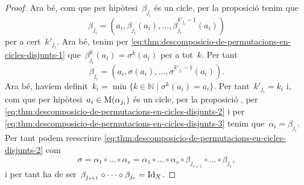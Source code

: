 \documentclass[../fonaments-de-les-matematiques.tex]{subfiles}
\begin{document}
\begin{proof}
        Ara bé, com que per hipòtesi~\(\beta_{j_{i}}\) és un cicle, per la proposició  tenim que
        \[
            \beta_{j_{i}}=\left(a_{i},\beta_{j_{i}}(a_{i}),\dots,\beta^{k'_{j_{i}}-1}_{j_{i}}(a_{i})\right)
        \]
        per a cert~\(k'_{j_{i}}\).
        Ara bé, tenim per \eqref{eq:thm:descomposicio-de-permutacions-en-cicles-disjunts-1} que~\(\beta^{k}_{j_{i}}(a_{i})=\sigma^{k}(a_{i})\) per a tot~\(k\).
        Per tant
        \[
            \beta_{j_{i}}=\left(a_{i},\sigma(a_{i}),\dots,\sigma^{k'_{j_{i}}-1}(a_{i})\right).
        \]
        Ara bé, havíem definit~\(k_{i}=\min\{k\in\mathbb{N}\mid\sigma^{k}(a_{i})=a_{i}\}\).
        Per tant~\(k'_{j_{i}}=k_{i}\) i, com que per hipòtesi~\(a_{i}\in\operatorname{M}(\alpha_{j_{i}})\) és un cicle, per la proposició , per \eqref{eq:thm:descomposicio-de-permutacions-en-cicles-disjunts-2} i per \eqref{eq:thm:descomposicio-de-permutacions-en-cicles-disjunts-3} tenim que~\(\alpha_{i}=\beta_{j_{i}}\).
        Per tant podem reescriure \eqref{eq:thm:descomposicio-de-permutacions-en-cicles-disjunts-2} com
        \[
            \sigma=\alpha_{1}\circ\dots\circ\alpha_{s}=\alpha_{1}\circ\dots\circ\alpha_{s}\circ\beta_{j_{s+1}}\circ\dots\circ\beta_{j_{r}},
        \]
        i per tant ha de ser~\(\beta_{j_{s+1}}\circ\dots\circ\beta_{j_{r}}=\operatorname{Id}_{X}\).
    \end{proof}
\end{document}
